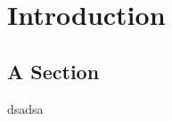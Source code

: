 \documentclass[11pt,
  footinclude,headinclude,
  abstract=on
]{scrreprt}
\begin{document}
  

  
  
  \chapter{Introduction}
  \section{A Section}
   dsadsa
\end{document}
